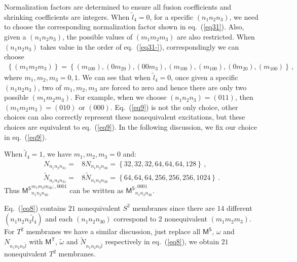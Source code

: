 \documentclass[11pt,nofootinbib,preprint]{revtex4-1}
\begin{document}
Normalization factors are determined to ensure all fusion coefficients and shrinking coefficients are integers. When $\tilde{l}_4=0$, for a specific $\left( n_1n_2n_3 \right)$, we need to choose the corresponding normalization factor shown in eq.~(\ref{eq31}). Also, given a $\left( n_1n_2n_3 \right)$, the possible values of $\left( m_1m_2m_3 \right)$ are also restricted. When $\left( n_1n_2n_3 \right)$ takes value in the order of eq.~(\ref{eq31-}), correspondingly we can choose
\begin{align}
	\left\{ \left( m_1m_2m_3 \right) \right\} =\left\{ \left( m_100 \right) ,\left( 0m_20 \right) ,\left( 00m_3 \right) ,\left( m_100 \right) ,\left( m_100 \right) ,\left( 0m_20 \right) ,\left( m_100 \right) \right\}  \,,
	\label{eq9}
\end{align}
where $m_1,m_2,m_3=0,1$. We can see that when $\tilde{l}_4=0$, once given a specific $\left( n_1n_2n_3 \right)$, two of $m_1,m_2,m_3$ are forced to zero and hence there are only two possible $\left( m_1m_2m_3 \right)$. For example, when we choose $\left( n_1n_2n_3 \right)=\left( 011 \right)$, then $\left( m_1m_2m_3 \right)=\left( 010 \right)$ or $\left( 000 \right)$. Eq.~(\ref{eq9}) is not the only choice, other choices can also correctly represent these nonequivalent excitations, but these choices are equivalent to eq.~(\ref{eq9}). In the following discussion, we fix our choice in eq.~(\ref{eq9}).

When $\tilde{l}_4=1$, we have $m_1,m_2,m_3=0$ and:
\begin{align}
	N_{n_1n_2n_31}=&8N_{n_1n_2n_30}=\left\{32,32,32,64,64,64,128\right\} \,,\nonumber
	\\
	\tilde{N}_{n_1n_2n_31}=&8\tilde{N}_{n_1n_2n_30}=\left\{64,64,64,256,256,256,1024\right\}\,.
\end{align}
Thus ${\mathsf{M}^{\mathsf{S}}}_{n_1n_2n_30}^{m_1m_2m_30;,0001}$ can be written as ${\mathsf{M}^{\mathsf{S}}}_{n_1n_2n_30}^{,0001}$.

Eq.~(\ref{eq8}) contains $21$ nonequivalent $S^2$ membranes since there are $14$ different $\left( n_1n_2n_3\tilde{l}_4 \right)$ and each $\left( n_1n_2n_30 \right)$ correspond to $2$ nonequivalent $\left( m_1m_2m_3 \right)$. For $T^2$ membranes we have a similar discussion, just replace all $\mathsf{M^S}$, $\omega$ and $N_{n_1n_2n_3\tilde{l}}$ with $\mathsf{M^T}$, $\tilde{\omega}$ and $\tilde{N}_{n_1n_2n_3\tilde{l}}$ respectively in eq.~(\ref{eq8}), we obtain $21$ nonequivalent $T^2$ membranes.
\end{document}
